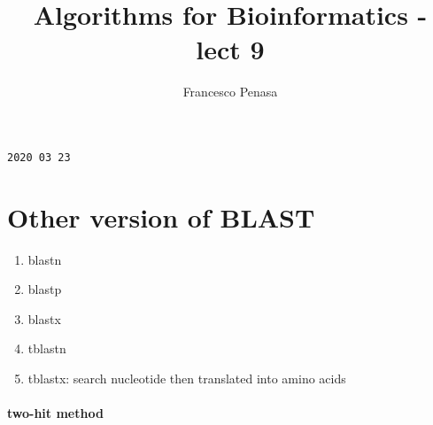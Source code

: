 \documentclass[11pt]{article}
\begin{document}
\author{Francesco Penasa}
\title{Algorithms for Bioinformatics - lect 9}
\maketitle

\medskip

\texttt{2020 03 23}

\section{Other version of BLAST} %
\label{sec:other_version_of_blast}
  \begin{enumerate}
  	\item blastn
  	\item blastp
  	\item blastx
  	\item tblastn
  	\item tblastx: search nucleotide then translated into amino acids
  \end{enumerate}

\paragraph{two-hit method} %
\label{par:two_hit_method}

\end{document}
